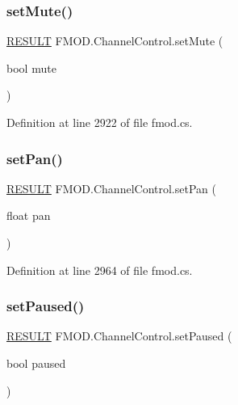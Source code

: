 \subsubsection{\texorpdfstring{set\+Mute()}{setMute()}}
{\footnotesize\ttfamily \hyperlink{namespace_f_m_o_d_a305d1176ef3f8c8815861a60407ac33d}{R\+E\+S\+U\+LT} F\+M\+O\+D.\+Channel\+Control.\+set\+Mute (\begin{DoxyParamCaption}\item[{bool}]{mute }\end{DoxyParamCaption})}



Definition at line 2922 of file fmod.\+cs.

\mbox{\label{class_f_m_o_d_1_1_channel_control_a24f9a0e87f7ba9f80121f060f0cfed42}} 
\subsubsection{\texorpdfstring{set\+Pan()}{setPan()}}
{\footnotesize\ttfamily \hyperlink{namespace_f_m_o_d_a305d1176ef3f8c8815861a60407ac33d}{R\+E\+S\+U\+LT} F\+M\+O\+D.\+Channel\+Control.\+set\+Pan (\begin{DoxyParamCaption}\item[{float}]{pan }\end{DoxyParamCaption})}



Definition at line 2964 of file fmod.\+cs.

\mbox{\label{class_f_m_o_d_1_1_channel_control_aab392876c307238b40444d323bb5a78c}} 
\subsubsection{\texorpdfstring{set\+Paused()}{setPaused()}}
{\footnotesize\ttfamily \hyperlink{namespace_f_m_o_d_a305d1176ef3f8c8815861a60407ac33d}{R\+E\+S\+U\+LT} F\+M\+O\+D.\+Channel\+Control.\+set\+Paused (\begin{DoxyParamCaption}\item[{bool}]{paused }\end{DoxyParamCaption})}



